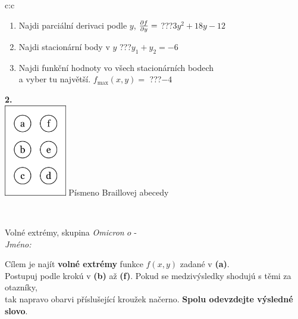 \documentclass[10pt]{report}
\newcommand\omicron{o}
\begin{document}
\begin{tabular}{c:c}
\begin{minipage}[c][104.5mm][t]{0.5\linewidth}
\begin{center}
\begin{minipage}{0.79\linewidth}
\begin{center}
\begin{varwidth}{\linewidth}
\begin{enumerate}
\item Najdi parciální derivaci podle $y$, $\pdv{f}{y}=$\quad \dotfill\; ???\;\dotfill \quad $3y^2+18y-12$
\item Najdi stacionární body v $y$\quad \dotfill\; ???\;\dotfill \quad $y_1+y_2=-6$
\item Najdi funkční hodnoty vo všech stacionárních bodech \\ \phantom{xxxxxx} a vyber tu najvětší. $f_{\text{max}}(x,y)=$\quad \dotfill\; ???\;\dotfill \quad $-4$
\end{enumerate}
\end{varwidth}
\end{center}
\end{minipage}
\begin{minipage}{0.20\linewidth}
\begin{center}
{\Huge\bfseries 2.} \\[2mm]
\includegraphics[height=40mm]{../images/braille.png}
{\small Písmeno Braillovej abecedy}
\end{center}
\end{minipage}
\end{center}
\end{minipage}
\\ \hdashline
\begin{minipage}[c][104.5mm][t]{0.5\linewidth}
\begin{center}
\vspace{7mm}
{\huge Volné extrémy, skupina \textit{Omicron $\omicron$} -}\\[5mm]
\textit{Jméno:}\phantom{xxxxxxxxxxxxxxxxxxxxxxxxxxxxxxxxxxxxxxxxxxxxxxxxxxxxxxxxxxxxxxxxx}\\[5mm]
\begin{minipage}{0.95\linewidth}
\begin{center}
Cílem je najít \textbf{volné extrémy} funkce $f(x,y)$ zadané v \textbf{(a)}.\\Postupuj podle krokú v \textbf{(b)} až \textbf{(f)}. Pokud se medzivýsledky shodujú s těmi za otazníky,\\tak napravo obarvi příslušející kroužek načerno. \textbf{Spolu odevzdejte výsledné slovo}.

\end{center}
\end{minipage}
\end{center}
\end{minipage}
\end{tabular}
\end{document}
